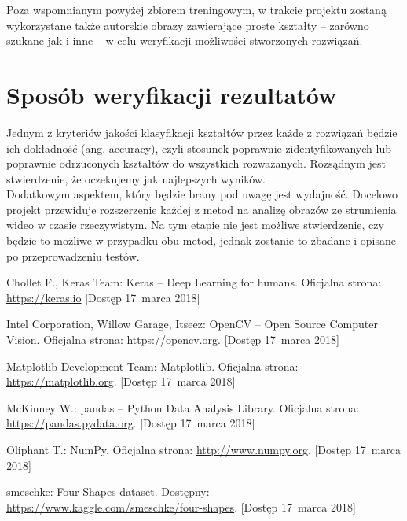 \documentclass[11pt,a4paper]{article}
\begin{document}
Poza wspomnianym powyżej zbiorem treningowym, w trakcie projektu zostaną wykorzystane także autorskie obrazy zawierające proste kształty -- zarówno szukane jak i inne -- w celu weryfikacji możliwości stworzonych rozwiązań.

\section{Sposób weryfikacji rezultatów} %

Jednym z kryteriów jakości klasyfikacji kształtów przez każde z rozwiązań będzie ich dokładność (ang. accuracy), czyli stosunek poprawnie zidentyfikowanych lub poprawnie odrzuconych kształtów do wszystkich rozważanych. Rozsądnym jest stwierdzenie, że oczekujemy jak najlepszych wyników.\\

Dodatkowym aspektem, który będzie brany pod uwagę jest wydajność. Docelowo projekt przewiduje rozszerzenie każdej z metod na analizę obrazów ze strumienia wideo w czasie rzeczywistym. Na tym etapie nie jest możliwe stwierdzenie, czy będzie to możliwe w przypadku obu metod, jednak zostanie to zbadane i opisane po przeprowadzeniu testów.

\begin{thebibliography}{9} %

        Chollet F., Keras Team:
        Keras -- Deep Learning for humans.
        Oficjalna strona: \url{https://keras.io}
        [Dostęp 17~marca 2018]

        Intel Corporation, Willow Garage, Itseez:
        OpenCV -- Open Source Computer Vision.
        Oficjalna strona: \url{https://opencv.org}.
        [Dostęp 17~marca 2018]

        Matplotlib Development Team:
        Matplotlib.
        Oficjalna strona: \url{https://matplotlib.org}.
        [Dostęp 17~marca 2018]

        McKinney W.:
        pandas -- Python Data Analysis Library.
        Oficjalna strona: \url{https://pandas.pydata.org}.
        [Dostęp 17~marca 2018]

        Oliphant T.:
        NumPy.
        Oficjalna strona: \url{http://www.numpy.org}.
        [Dostęp 17~marca 2018]

        smeschke:
        Four Shapes dataset.
        Dostępny: \url{https://www.kaggle.com/smeschke/four-shapes}.
        [Dostęp 17~marca 2018]

\end{thebibliography}
\end{document}
